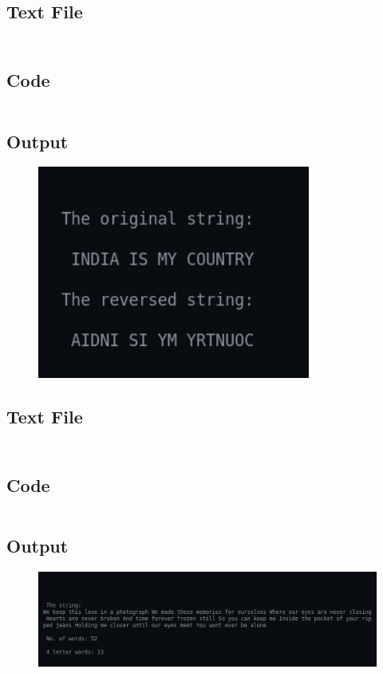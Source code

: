 \documentclass[12pt]{article}
\begin{document}
\subsection{Text File}
\inputminted{c}{q3.txt}

\newpage
\section{}
\subsection{Code}
\inputminted{c}{q4.c}
\newpage
\subsection{Output}
\begin{figure}[h]
    \centering
    \includegraphics[width=0.8\textwidth]{4.png}
\end{figure}
\subsection{Text File}
\inputminted{c}{INPUT.TXT}

\newpage
\section{}
\subsection{Code}
\inputminted{c}{q5.c}
\newpage
\subsection{Output}
\begin{figure}[h]
    \centering
    \includegraphics[width=1\textwidth]{5.png}
\end{figure}
\end{document}
